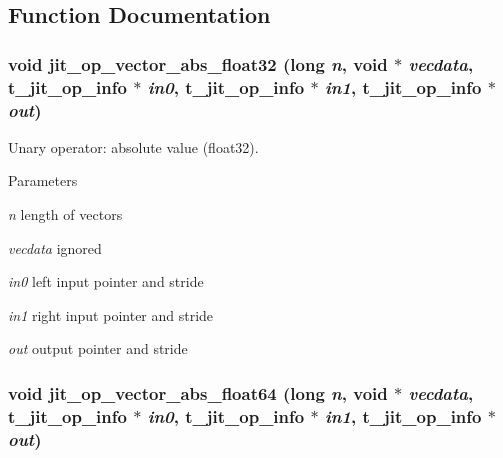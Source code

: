\subsection{Function Documentation}
\hypertarget{group__opvecmod_ga7cda6bd2a2d1163a7431f0be8015b0f5}{
\subsubsection[{jit\_\-op\_\-vector\_\-abs\_\-float32}]{\setlength{\rightskip}{0pt plus 5cm}void jit\_\-op\_\-vector\_\-abs\_\-float32 (long {\em n}, \/  void $\ast$ {\em vecdata}, \/  {\bf t\_\-jit\_\-op\_\-info} $\ast$ {\em in0}, \/  {\bf t\_\-jit\_\-op\_\-info} $\ast$ {\em in1}, \/  {\bf t\_\-jit\_\-op\_\-info} $\ast$ {\em out})}}
\label{group__opvecmod_ga7cda6bd2a2d1163a7431f0be8015b0f5}


Unary operator: absolute value (float32). 
\begin{DoxyParams}{Parameters}
\item[{\em n}]length of vectors \item[{\em vecdata}]ignored \item[{\em in0}]left input pointer and stride \item[{\em in1}]right input pointer and stride \item[{\em out}]output pointer and stride \end{DoxyParams}
\hypertarget{group__opvecmod_ga0e650f8993bb50aa1ad6761d40925ad0}{
\subsubsection[{jit\_\-op\_\-vector\_\-abs\_\-float64}]{\setlength{\rightskip}{0pt plus 5cm}void jit\_\-op\_\-vector\_\-abs\_\-float64 (long {\em n}, \/  void $\ast$ {\em vecdata}, \/  {\bf t\_\-jit\_\-op\_\-info} $\ast$ {\em in0}, \/  {\bf t\_\-jit\_\-op\_\-info} $\ast$ {\em in1}, \/  {\bf t\_\-jit\_\-op\_\-info} $\ast$ {\em out})}}
\label{group__opvecmod_ga0e650f8993bb50aa1ad6761d40925ad0}


